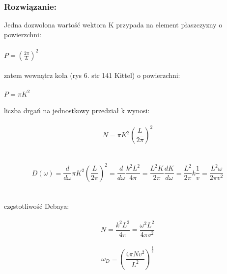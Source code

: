 \subsubsection*{Rozwiązanie:}
Jedna dozwolona wartość wektora K przypada na element płaszczyzny o powierzchni:
\\
\\
$P=(\frac{2\pi}{L})^2$
\\
\\
zatem wewnątrz koła (rys 6. str 141 Kittel) o powierzchni:
\\
\\
$P=\pi K^2$
\\
\\
liczba drgań na jednostkowy przedział k wynosi:
\\
\\
\begin{equation}
N=\pi K^2(\frac{L}{2\pi})^2
\end{equation}
\\
\\
\begin{equation}
D(\omega)=\frac{d}{d\omega} \pi K^2(\frac{L}{2\pi})^2=\frac{d}{d\omega}\frac{k^2L^2}{4\pi}=\frac{L^2K}{2\pi}\frac{dK}{d\omega}=\frac{L^2}{2\pi}k\frac{1}{v}=\frac{L^2\omega}{2\pi v^2}
\end{equation}
\\
\\
częstotliwość Debaya:
\\
\\
\begin {equation}
N=\frac{k^2L^2}{4\pi}=\frac{\omega^2L^2}{4\pi v^2}
\end{equation}
\\
\begin{equation}
\omega_D=(\frac{4\pi Nv^2}{L^2})^{\frac{1}{2}}
\end{equation}
\hrulefill
